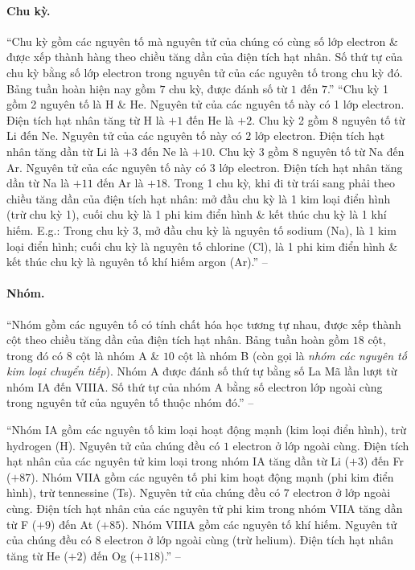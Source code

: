 \documentclass{article}
\numberwithin{equation}{section}
\begin{document}
\paragraph{Chu kỳ.} ``Chu kỳ gồm các nguyên tố mà nguyên tử của chúng có cùng số lớp electron \& được xếp thành hàng theo chiều tăng dần của điện tích hạt nhân. Số thứ tự của chu kỳ bằng số lớp electron trong nguyên tử của các nguyên tố trong chu kỳ đó. Bảng tuần hoàn hiện nay gồm $7$ chu kỳ, được đánh số từ $1$ đến $7$.'' ``Chu kỳ 1 gồm 2 nguyên tố là H \& He. Nguyên tử của các nguyên tố này có 1 lớp electron. Điện tích hạt nhân tăng từ H là $+1$ đến He là $+2$. Chu kỳ 2 gồm $8$ nguyên tố từ Li đến Ne. Nguyên tử của các nguyên tố này có $2$ lớp electron. Điện tích hạt nhân tăng dần từ Li là $+3$ đến Ne là $+10$. Chu kỳ 3 gồm $8$ nguyên tố từ Na đến Ar. Nguyên tử của các nguyên tố này có $3$ lớp electron. Điện tích hạt nhân tăng dần từ Na là $+11$ đến Ar là $+18$. Trong 1 chu kỳ, khi đi từ trái sang phải theo chiều tăng dần của điện tích hạt nhân: mở đầu chu kỳ là 1 kim loại điển hình (trừ chu kỳ 1), cuối chu kỳ là 1 phi kim điển hình \& kết thúc chu kỳ là 1 khí hiếm. E.g.: Trong chu kỳ 3, mở đầu chu kỳ là nguyên tố sodium (Na), là 1 kim loại điển hình; cuối chu kỳ là nguyên tố chlorine (Cl), là 1 phi kim điển hình \& kết thúc chu kỳ là nguyên tố khí hiếm argon (Ar).'' -- \cite[pp. 21--22]{SGK_KHTN_7_Canh_Dieu}

\paragraph{Nhóm.} ``Nhóm gồm các nguyên tố có tính chất hóa học tương tự nhau, được xếp thành cột theo chiều tăng dần của điện tích hạt nhân. Bảng tuần hoàn gồm $18$ cột, trong đó có $8$ cột là nhóm A \& $10$ cột là nhóm B (còn gọi là \textit{nhóm các nguyên tố kim loại chuyển tiếp}). Nhóm A được đánh số thứ tự bằng số La Mã lần lượt từ nhóm IA đến VIIIA. Số thứ tự của nhóm A bằng số electron lớp ngoài cùng trong nguyên tử của nguyên tố thuộc nhóm đó.'' -- \cite[p. 22]{SGK_KHTN_7_Canh_Dieu}

``Nhóm IA gồm các nguyên tố kim loại hoạt động mạnh (kim loại điển hình), trừ hydrogen (H). Nguyên tử của chúng đều có $1$ electron ở lớp ngoài cùng. Điện tích hạt nhân của các nguyên tử kim loại trong nhóm IA tăng dần từ Li ($+3$) đến Fr ($+87$). Nhóm VIIA gồm các nguyên tố phi kim hoạt động mạnh (phi kim điển hình), trừ tennessine (Ts). Nguyên tử của chúng đều có $7$ electron ở lớp ngoài cùng. Điện tích hạt nhân của các nguyên tử phi kim trong nhóm VIIA tăng dần từ F ($+9$) đến At ($+85$). Nhóm VIIIA gồm các nguyên tố khí hiếm. Nguyên tử của chúng đều có $8$ electron ở lớp ngoài cùng (trừ helium). Điện tích hạt nhân tăng từ He ($+2$) đến Og ($+118$).'' -- \cite[p. 23]{SGK_KHTN_7_Canh_Dieu}
\end{document}
